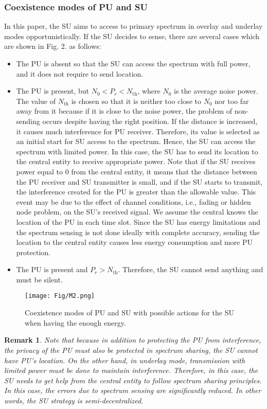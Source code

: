 \documentclass[journal]{IEEEtran}
\newtheorem{remark}{Remark}
\begin{document}
	\subsubsection{Coexistence modes of PU and SU}
		In this paper, the SU aims to access to primary spectrum in overlay and underlay modes opportunistically. If the SU decides to sense, there are several cases which are shown in Fig. 2. as follows:
		\begin{itemize}
			\item The PU is absent so that the SU can access the spectrum with full power, and it does not require to send location.
			\item The PU is present, but $N_0 < P_r < N_{\text{th}}$, where $N_0$ is the average noise power. The value of $N_{\text{th}}$ is chosen so that it is neither too close to $N_0$ nor too far away from it because if it is close to the noise power, the problem of non-sending occurs despite having the right position. If the distance is increased, it causes much interference for PU receiver. Therefore, its value is selected as an initial start for SU access to the spectrum. Hence, the SU can access the spectrum with limited power. In this case, the SU has to send its location to the central entity to receive appropriate power. Note that if the SU receives power equal to 0 from the central entity, it means that the distance between the PU receiver and SU transmitter is small, and if the SU starts to transmit, the interference created for the PU is greater than the allowable value. This event may be due to the effect of channel conditions, i.e., fading or hidden node problem, on the SU's received signal. We assume the central knows the location of the PU in each time slot. Since the SU has energy limitations and the spectrum sensing is not done ideally with complete accuracy, sending the location to the central entity causes less energy consumption and more PU protection.
			\item The PU is present and $P_r > N_{\text{th}}$. Therefore, the SU cannot send anything and must be silent.
		\end{itemize}

		\begin{figure}[!t]
			\centering
			\texttt{[image: Fig/M2.png]}
			\caption{Coexistence modes of PU and SU with possible actions for the SU when having the enough energy.}
			\label{Scenarios}
		\end{figure}
	
		\begin{remark}
			Note that because in addition to protecting the PU from interference, the privacy of the PU must also be protected in spectrum sharing, the SU cannot have PU's location. On the other hand, in underlay mode, transmission with limited power must be done to maintain interference. Therefore, in this case, the SU needs to get help from the central entity to follow spectrum sharing principles. In this case, the errors due to spectrum sensing are significantly reduced. In other words, the SU strategy is semi-decentralized.
		\end{remark}
\end{document}
